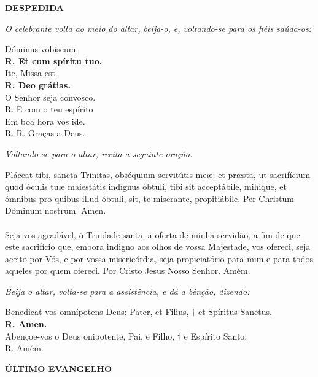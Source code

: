 \begin{center}
	\textbf{DESPEDIDA}
\end{center}
\begin{flushleft}
\textit{O celebrante volta ao meio do altar, beija-o, e, voltando-se para os fiéis saúda-os:}
\end{flushleft}

\begin{multicols}{2}
	\noindent Dóminus vobíscum.
	\\ \textbf{R. Et cum spíritu tuo.}
	\\ Ite, Missa est.
	\\ \textbf{R. Deo grátias.}
	\\O Senhor seja convosco.
	\\R. E com o teu espírito
	\\ Em boa hora vos ide.
	\\ R. R. Graças a Deus.
\end{multicols}

\textit{Voltando-se para o altar, recita a seguinte oração.}


\begin{multicols}{2}
	\noindent Pláceat tibi, sancta Trínitas, obséquium
	servitútis meæ: et præsta, ut sacrifícium
	quod óculis tuæ maiestátis indígnus
	óbtuli, tibi sit acceptábile, mihique, et
	ómnibus pro quibus illud óbtuli, sit, te
	miserante, propitiábile. Per Christum
	Dóminum nostrum. Amen.
	\\
	\\ Seja-vos agradável, ó Trindade santa, a
	oferta de minha servidão, a fim de que
	este sacrifício que, embora indigno aos
	olhos de vossa Majestade, vos ofereci,
	seja aceito por Vós, e por vossa
	misericórdia, seja propiciatório para
	mim e para todos aqueles por quem
	ofereci. Por Cristo Jesus Nosso Senhor.
	Amém.
\end{multicols}

\textit{Beija o altar, volta-se para a assistência, e dá a bênção, dizendo:}

\begin{multicols}{2}
	\noindent Benedicat vos omnípotens Deus: Pater, et
	Filius, $\dagger$ et Spíritus Sanctus.
	\\ \textbf{R. Amen.}
	\\ Abençoe-vos o Deus onipotente, Pai, e
	Filho, $\dagger$ e Espírito Santo.
	\\ R. Amém.
\end{multicols}

\begin{center}
	\textbf{ÚLTIMO EVANGELHO}
\end{center}

